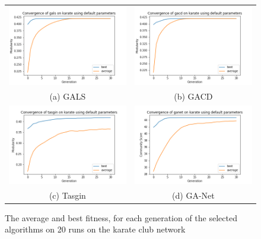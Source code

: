 \begin{figure}
	\begin{tabular}{cc}
		\includegraphics[width=65mm]{images/gals_default_karate.png} &   \includegraphics[width=65mm]{images/gacd_default_karate.png} \\
		(a) GALS & (b) GACD \\[6pt]
		\includegraphics[width=65mm]{images/tasgin_default_karate.png}  &
		\includegraphics[width=65mm]{images/ganet_default_karate.png} \\
		(c) Tasgin & (d) GA-Net \\[6pt]
	\end{tabular}
	\caption{The average and best fitness, for each generation of the selected algorithms on 20  runs on the karate club network}
\end{figure}


